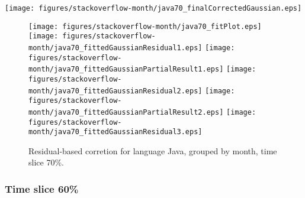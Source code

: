 \begin{center}
{\texttt{[image: figures/stackoverflow-month/java70\_finalCorrectedGaussian.eps]}}
\end{center}

\FloatBarrier

\begin{figure}[t]
\centering
{}
{\texttt{[image: figures/stackoverflow-month/java70\_fitPlot.eps]}}
{\texttt{[image: figures/stackoverflow-month/java70\_fittedGaussianResidual1.eps]}}
{\texttt{[image: figures/stackoverflow-month/java70\_fittedGaussianPartialResult1.eps]}}
{\texttt{[image: figures/stackoverflow-month/java70\_fittedGaussianResidual2.eps]}}
{\texttt{[image: figures/stackoverflow-month/java70\_fittedGaussianPartialResult2.eps]}}
{\texttt{[image: figures/stackoverflow-month/java70\_fittedGaussianResidual3.eps]}}
\caption{Residual-based corretion for language Java, grouped by month, time slice 70\%.}
\end{figure}


\FloatBarrier


\subsubsection{Time slice 60\%}

